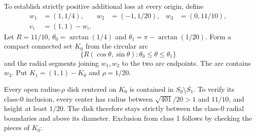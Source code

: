 To establish strictly positive additional loss at every origin, define
\begin{align*}
 w_1&=(1,1/4),&w_2&=(-1,1/20),&w_3&=(0,11/10),\\
 v_i&=(1,1)-w_i.&&&
\end{align*}
Let $R=11/10$, $\theta_0=\arctan(1/4)$ and
$\theta_1=\pi-\arctan(1/20)$. Form a compact connected set $K_0$ from the circular arc
\[
 \{R(\cos\theta,\sin\theta):\theta_0\leq\theta\leq\theta_1\}
\]
and the radial segments joining $w_1,w_2$ to the two arc endpoints. The arc contains $w_3$. Put $K_1=(1,1)-K_0$ and $\rho=1/20$.

Every open radius-$\rho$ disk centered on $K_0$ is contained in $S_0\setminus\overline{S_1}$. To verify its class-0 inclusion, every center has radius between $\sqrt{401}/20>1$ and $11/10$, and height at least $1/20$. The disk therefore stays strictly between the class-0 radial boundaries and above its diameter. Exclusion from class 1 follows by checking the pieces of $K_0$:

